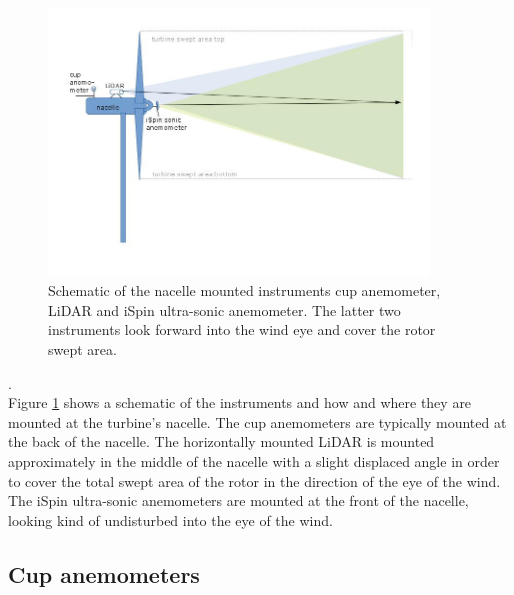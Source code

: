 \begin{figure}[h!]
\includegraphics[width=0.9\textwidth]{figures/nacelle_mounted_instruments.jpg}
\caption{Schematic of the nacelle mounted instruments cup anemometer, LiDAR and iSpin ultra-sonic anemometer. The latter two instruments look forward into the wind eye and cover the rotor swept area.}
\label{fig:nacelle_schematic}
\end{figure}

.\\
Figure \ref{fig:nacelle_schematic} shows a schematic of the instruments and how and where they are mounted at the turbine’s nacelle. The cup anemometers are typically mounted at the back of the nacelle. The horizontally mounted LiDAR is mounted approximately in the middle of the nacelle with a slight displaced angle in order to cover the total swept area of the rotor in the direction of the eye of the wind. The iSpin ultra-sonic anemometers are mounted at the front of the nacelle, looking kind of undisturbed into the eye of the wind. 


\subsection{Cup anemometers}\label{sec:cup_anemometers}

